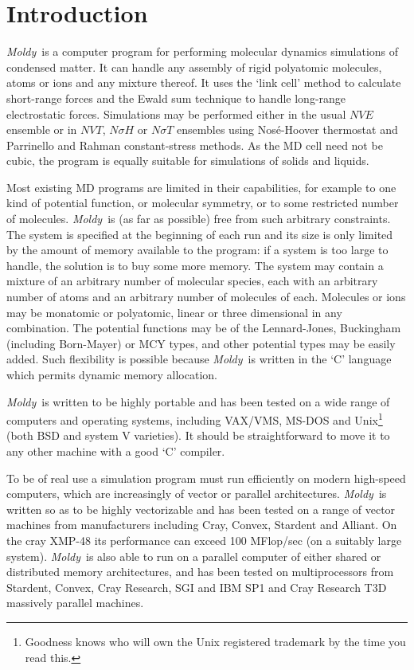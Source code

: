 \documentclass[a4paper,twoside]{report}
\newcommand{\moldy}{\emph{Moldy}}
\begin{document}
\chapter{Introduction}   %

\moldy\ is a computer program for performing molecular dynamics
simulations of condensed matter.  It can handle any assembly of rigid
polyatomic molecules, atoms or ions and any mixture thereof. It uses
the `link cell' method to calculate short-range forces and the Ewald
sum technique to handle long-range electrostatic forces.  Simulations
may be performed either in the usual $NVE$ ensemble or in $NVT$,
$N\sigma H$ or $N\sigma T$ ensembles using Nos\'e-Hoover thermostat and
Parrinello and Rahman constant-stress methods. As the MD cell need not
be cubic, the program is equally suitable for simulations of solids
and liquids.

Most existing MD programs are limited in their capabilities, for
example to one kind of potential function, or molecular symmetry, or
to some restricted number of molecules.  \moldy\  is (as far as
possible) free from such arbitrary constraints.  The system is
specified at the beginning of each run and its size is only limited by
the amount of memory available to the program: if a system is too
large to handle, the solution is to buy some more memory.  The system
may contain a mixture of an arbitrary number of molecular species,
each with an arbitrary number of atoms and an arbitrary number of
molecules of each. Molecules or ions may be monatomic or polyatomic,
linear or three dimensional in any combination.  The potential
functions may be of the Lennard-Jones, Buckingham (including
Born-Mayer) or MCY types, and other potential types may be easily
added.  Such flexibility is possible because \moldy\  is written in the
`C' language which permits dynamic memory allocation.

\moldy\  is written to be highly portable and has been tested on a wide
range of computers and operating systems, including VAX/VMS,
MS-DOS and Unix\footnote{Goodness knows who will own the Unix
registered trademark by the time you read this.}  (both BSD and system V
varieties).  It should be straightforward to move it to any other
machine with a good `C' compiler.

To be of real use a simulation  program must run efficiently on modern
high-speed computers, which  are  increasingly of vector   or parallel
architectures.  \moldy\  is written so  as to be highly vectorizable and
has been  tested on a   range of  vector machines  from  manufacturers
including Cray, Convex, Stardent and  Alliant.  On the cray XMP-48 its
performance can exceed 100 MFlop/sec (on a suitably large  system).
\moldy\ is also able to run on a parallel computer of either shared or
distributed memory architectures, and has been tested on
multiprocessors from Stardent, Convex, Cray Research, SGI and IBM SP1
and Cray Research T3D massively parallel machines.
\end{document}
